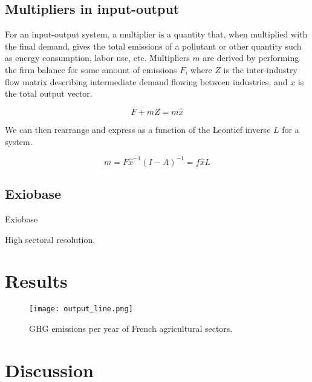 \documentclass[a4paper,twoside]{article}
\begin{document}
\subsection{Multipliers in input-output}

For an input-output system, a multiplier is a quantity that, when multiplied with the final demand, gives the total emissions of a pollutant or other quantity such as energy consumption, labor use, etc. Multipliers $m$ are derived by performing the firm balance for some amount of emissions $F$, where $Z$ is the inter-industry flow matrix describing intermediate demand flowing between industries, and $x$ is the total output vector.

\begin{equation}
F + m Z = m \hat{x}
\end{equation}

We can then rearrange and express as a function of the Leontief inverse $L$ for a system.

\begin{equation}
m = F \hat{x}^{-1} (I - A)^{-1} = f \hat{x} L
\end{equation}

\subsection{Exiobase}

Exiobase

High sectoral resolution.



\section{Results}

\begin{figure}[H]
\centering
\texttt{[image: output\_line.png]}
\caption{GHG emissions per year of French agricultural sectors.}\label{fig:GHG} 
\end{figure}

\section{Discussion}


\end{document}
